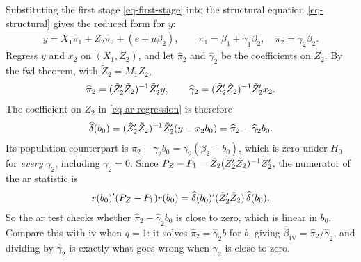 \documentclass[a4paper,12pt]{article}
\begin{document}
\begin{remark}\label{rmk-ar-reduced-form}
	Substituting the first stage \eqref{eq-first-stage} into the structural equation \eqref{eq-structural} gives the reduced form for $y$:
	\begin{align*}
		y=X_1\pi_1+Z_2\pi_2+(e+u\beta_2),
		\qquad
		\pi_1=\beta_1+\gamma_1\beta_2,
		\quad
		\pi_2=\gamma_2\beta_2.
	\end{align*}
	Regress $y$ and $x_2$ on $(X_1,Z_2)$, and let $\widehat\pi_2$ and $\widehat\gamma_2$ be the coefficients on $Z_2$.
	By the \gls{fwl} theorem, with $\tilde Z_2=M_1Z_2$,
	\begin{align*}
		\widehat\pi_2=(\tilde Z_2^{\prime}\tilde Z_2)^{-1}\tilde Z_2^{\prime} y,
		\qquad
		\widehat\gamma_2=(\tilde Z_2^{\prime}\tilde Z_2)^{-1}\tilde Z_2^{\prime} x_2.
	\end{align*}
	The coefficient on $Z_2$ in \eqref{eq-ar-regression} is therefore
	\begin{align*}
		\widehat\delta(b_0)
		=(\tilde Z_2^{\prime}\tilde Z_2)^{-1}\tilde Z_2^{\prime}(y-x_2b_0)
		=\widehat\pi_2-\widehat\gamma_2b_0.
	\end{align*}
	Its population counterpart is $\pi_2-\gamma_2b_0=\gamma_2(\beta_2-b_0)$, which is zero under $H_0$ for \emph{every} $\gamma_2$, including $\gamma_2=0$.
	Since $P_Z-P_1=\tilde Z_2(\tilde Z_2^{\prime}\tilde Z_2)^{-1}\tilde Z_2^{\prime}$,
	the numerator of the \gls{ar} statistic is
	\begin{align*}
		r(b_0)^{\prime}(P_Z-P_1)r(b_0)
		=\widehat\delta(b_0)^{\prime}(\tilde Z_2^{\prime}\tilde Z_2)\,\widehat\delta(b_0).
	\end{align*}
	So the \gls{ar} test checks whether $\widehat\pi_2-\widehat\gamma_2b_0$ is close to zero, which is linear in $b_0$.
	Compare this with \gls{iv} when $q=1$: it solves $\widehat\pi_2=\widehat\gamma_2b$ for $b$, giving $\widehat\beta_{\mathrm{IV}}=\widehat\pi_2/\widehat\gamma_2$,
	and dividing by $\widehat\gamma_2$ is exactly what goes wrong when $\gamma_2$ is close to zero.
\end{remark}
\end{document}
